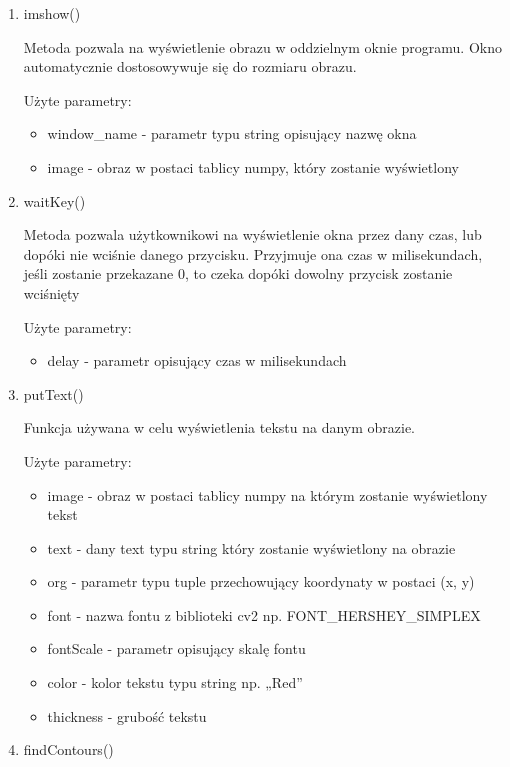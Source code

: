 \documentclass{article}
\begin{document}
\begin{enumerate}
\begin{itemize}
\end{itemize}

\item imshow() \cite{opencv5}

Metoda pozwala na wyświetlenie obrazu w oddzielnym oknie programu. Okno automatycznie dostosowywuje się do rozmiaru obrazu.

Użyte parametry:
\begin{itemize}
\item window\_name - parametr typu string opisujący nazwę okna
\item image - obraz w postaci tablicy numpy, który zostanie wyświetlony
\end{itemize}

\item waitKey() \cite{opencv6}

Metoda pozwala użytkownikowi na wyświetlenie okna przez dany czas, lub dopóki nie wciśnie danego przycisku. Przyjmuje ona czas w milisekundach, jeśli zostanie przekazane 0, to czeka dopóki dowolny przycisk zostanie wciśnięty

Użyte parametry:
\begin{itemize}
\item delay - parametr opisujący czas w milisekundach
\end{itemize}

\item putText() \cite{opencv7}

Funkcja używana w celu wyświetlenia tekstu na danym obrazie.

Użyte parametry:

\begin{itemize}
\item image - obraz w postaci tablicy numpy na którym zostanie wyświetlony tekst
\item text - dany text typu string który zostanie wyświetlony na obrazie
\item org - parametr typu tuple przechowujący koordynaty w postaci (x, y)
\item font - nazwa fontu z biblioteki cv2 np. FONT\_HERSHEY\_SIMPLEX
\item fontScale - parametr opisujący skalę fontu
\item color - kolor tekstu typu string np. „Red”
\item thickness - grubość tekstu
\end{itemize}

\item findContours() \cite{opencv8}


\end{enumerate}
\end{document}
